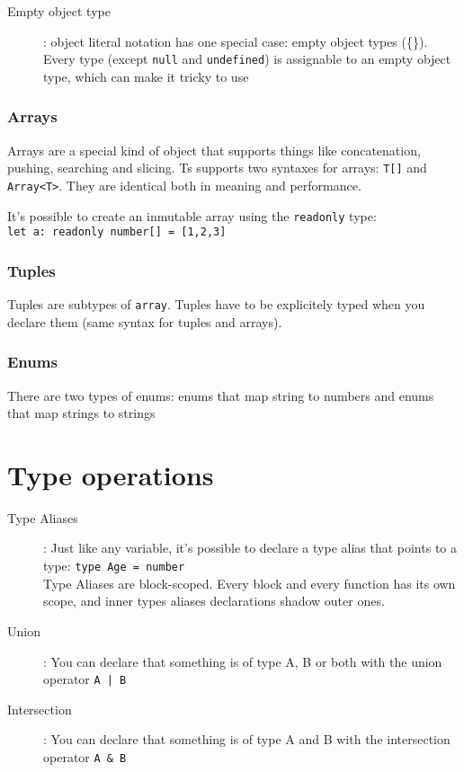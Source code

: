 \documentclass[french]{article}
\begin{document}
\begin{description}
  \item[Empty object type]: object literal notation has one special case: empty object types (\{\}). Every type (except \lstinline{null} and \lstinline{undefined}) is assignable to an empty object type, which can make it tricky to use

\end{description}

\subsubsection{Arrays}

Arrays are a special kind of object that supports things like concatenation, pushing, searching and slicing. Ts supports two syntaxes for arrays: \lstinline{T[]} and \lstinline{Array<T>}. They are identical both in meaning and performance.

It's possible to create an inmutable array using the \lstinline{readonly} type: \\\lstinline{let a: readonly number[] = [1,2,3]}

\subsubsection{Tuples}

Tuples are subtypes of \lstinline{array}. Tuples have to be explicitely typed when you declare them (same syntax for tuples and arrays).

\subsubsection{Enums}

There are two types of enums: enums that map string to numbers and enums that map strings to strings

\section{Type operations}

\begin{description}
  \item[Type Aliases]: Just like any variable, it's possible to declare a type alias that points to a type: \lstinline{type Age = number} \\
    Type Aliases are block-scoped. Every block and every function has its own scope, and inner types aliases declarations shadow outer ones.
  \item[Union]: You can declare that something is of type A, B or both with the union operator \lstinline{A | B} 
  \item[Intersection]: You can declare that something is of type A and B with the intersection operator \lstinline{A & B} 
\end{description}
\end{document}
